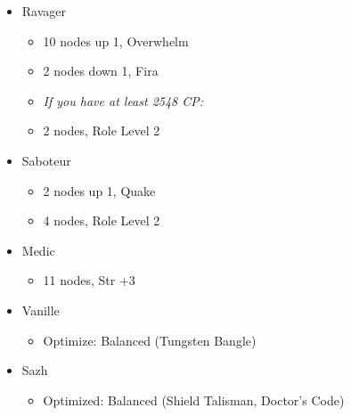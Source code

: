 \begin{multicols}{2}
\begin{menu}
\begin{itemize}
\begin{itemize}
\begin{itemize}
                \item Ravager
                      \begin{itemize}
                        \item 10 nodes up 1, Overwhelm
                        \item 2 nodes down 1, Fira
                        \item \textit{If you have at least 2548 CP:}
                        \item 2 nodes, Role Level 2
                      \end{itemize}
                \item Saboteur
                      \begin{itemize}
                        \item 2 nodes up 1, Quake
                        \item 4 nodes, Role Level 2
                      \end{itemize}
                \item Medic
                      \begin{itemize}
                        \item 11 nodes, Str +3
                      \end{itemize}
              \end{itemize}
      \end{itemize}
      \columnbreak
      \equip
      \begin{itemize}
        \item Vanille
              \begin{itemize}
                \item \begin{flushleft}Optimize: Balanced (Tungsten Bangle)\end{flushleft}
              \end{itemize}
        \item Sazh
              \begin{itemize}
                \item \begin{flushleft}Optimized: Balanced (Shield Talisman, Doctor's Code)\end{flushleft}
              \end{itemize}
      \end{itemize}
    \end{itemize}
  \end{menu}
  \renewcommand{\first}{[1] Slash \& Burn (\com/\rav)}
  \renewcommand{\second}{[2] War \& Peace (\com/\med)}
  \renewcommand{\third}{[3] Tide Turner (\syn/\sab)}
  \renewcommand{\fourth}{[4] }
  \renewcommand{\fifth}{[5] Undermine (\rav/\sab)}
  \renewcommand{\sixth}{[6] Divide \& Conquer (\com/\sab)}


\end{multicols}
